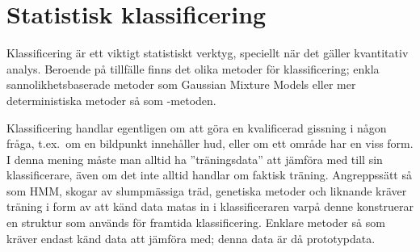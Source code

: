 \documentclass[../rapport_MVEX01-11-05]{subfiles}
\begin{document}
\section{Statistisk klassificering}\label{sec:klassificering}

Klassificering är ett viktigt statistiskt verktyg, speciellt när det gäller
kvantitativ analys. Beroende på tillfälle finns det olika metoder för
klassificering; enkla sannolikhetsbaserade metoder som Gaussian Mixture
Models eller mer deterministiska metoder så som \knn-metoden.

Klassificering handlar egentligen om att göra en kvalificerad gissning
i någon fråga, t.ex.~om en bildpunkt innehåller hud, eller om ett område har
en viss form. I denna mening måste man alltid ha ''träningsdata'' att jämföra med
till sin
klassificerare, även om det inte alltid handlar om faktisk träning. Angreppssätt
så som HMM, skogar av slumpmässiga träd, genetiska metoder och liknande kräver
träning i form av att känd data matas in i klassificeraren varpå denne
konstruerar en struktur som används för framtida klassificering.
Enklare metoder så som \knn 
kräver endast känd data att jämföra med; denna data är då prototypdata.

\end{document}
